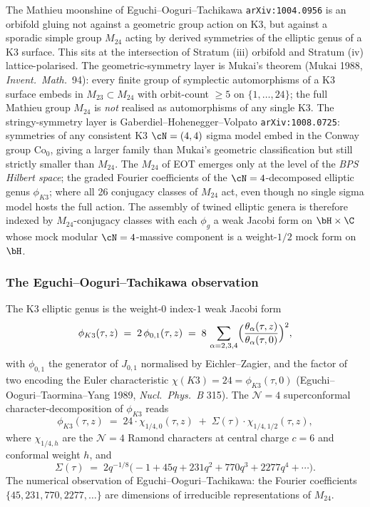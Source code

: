 The Mathieu moonshine of Eguchi--Ooguri--Tachikawa \texttt{arXiv:1004.0956} is an orbifold gluing not against a geometric group action on K3, but against a sporadic simple group $M_{24}$ acting by derived symmetries of the elliptic genus of a K3 surface. This sits at the intersection of Stratum (iii) orbifold and Stratum (iv) lattice-polarised. The geometric-symmetry layer is Mukai's theorem (Mukai 1988, \emph{Invent.\ Math.}\ 94): every finite group of symplectic automorphisms of a K3 surface embeds in $M_{23} \subset M_{24}$ with orbit-count $\geq 5$ on $\{1, \ldots, 24\}$; the full Mathieu group $M_{24}$ is \emph{not} realised as automorphisms of any single K3. The stringy-symmetry layer is Gaberdiel--Hohenegger--Volpato \texttt{arXiv:1008.0725}: symmetries of any consistent K3 $\cN = (4, 4)$ sigma model embed in the Conway group $\mathrm{Co}_0$, giving a larger family than Mukai's geometric classification but still strictly smaller than $M_{24}$. The $M_{24}$ of EOT emerges only at the level of the \emph{BPS Hilbert space}; the graded Fourier coefficients of the $\cN = 4$-decomposed elliptic genus $\phi_{K3}$; where all 26 conjugacy classes of $M_{24}$ act, even though no single sigma model hosts the full action. The assembly of twined elliptic genera is therefore indexed by $M_{24}$-conjugacy classes with each $\phi_g$ a weak Jacobi form on $\bH \times \C$ whose mock modular $\cN = 4$-massive component is a weight-$1/2$ mock form on $\bH$.

\subsubsection{The Eguchi--Ooguri--Tachikawa observation}
\label{subsec:eot-observation}

The K3 elliptic genus is the weight-$0$ index-$1$ weak Jacobi form
\[
\phi_{K3}(\tau, z) \;=\; 2 \, \phi_{0, 1}(\tau, z) \;=\; 8 \, \sum_{\alpha = 2, 3, 4} \Bigl(\frac{\theta_\alpha(\tau, z)}{\theta_\alpha(\tau, 0)}\Bigr)^2,
\]
with $\phi_{0, 1}$ the generator of $J_{0, 1}$ normalised by Eichler--Zagier, and the factor of two encoding the Euler characteristic $\chi(K3) = 24 = \phi_{K3}(\tau, 0)$ (Eguchi--Ooguri--Taormina--Yang 1989, \emph{Nucl.\ Phys.\ B} 315).
The $\mathcal{N}=4$ superconformal character-decomposition of $\phi_{K3}$ reads
\[
\phi_{K3}(\tau, z) \;=\; 24 \cdot \chi_{1/4, 0}(\tau, z) \;+\; \Sigma(\tau) \cdot \chi_{1/4, 1/2}(\tau, z),
\]
where $\chi_{1/4, h}$ are the $\mathcal{N}=4$ Ramond characters at central charge $c = 6$ and conformal weight $h$, and
\[
\Sigma(\tau) \;=\; 2 q^{-1/8}\bigl(-1 + 45 q + 231 q^2 + 770 q^3 + 2277 q^4 + \cdots\bigr).
\]
The numerical observation of Eguchi--Ooguri--Tachikawa: the Fourier coefficients $\{45, 231, 770, 2277, \dots\}$ are dimensions of irreducible representations of $M_{24}$.

